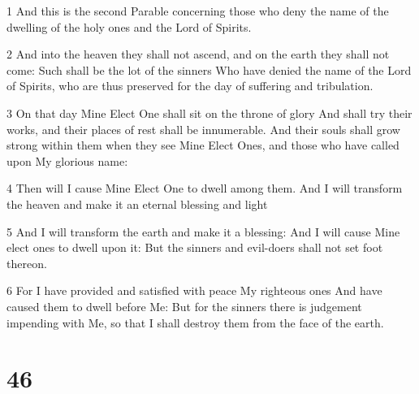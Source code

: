 \par 1 And this is the second Parable concerning those who deny the name of the dwelling of the holy ones and the Lord of Spirits.
\par 2 And into the heaven they shall not ascend, and on the earth they shall not come: Such shall be the lot of the sinners Who have denied the name of the Lord of Spirits, who are thus preserved for the day of suffering and tribulation.
\par 3 On that day Mine Elect One shall sit on the throne of glory And shall try their works, and their places of rest shall be innumerable. And their souls shall grow strong within them when they see Mine Elect Ones, and those who have called upon My glorious name:
\par 4 Then will I cause Mine Elect One to dwell among them. And I will transform the heaven and make it an eternal blessing and light
\par 5 And I will transform the earth and make it a blessing: And I will cause Mine elect ones to dwell upon it: But the sinners and evil-doers shall not set foot thereon.
\par 6 For I have provided and satisfied with peace My righteous ones And have caused them to dwell before Me: But for the sinners there is judgement impending with Me, so that I shall destroy them from the face of the earth.

\chapter{46}

